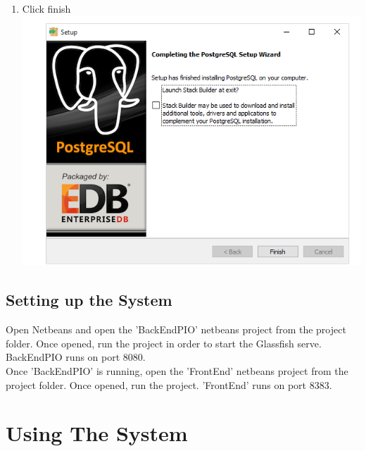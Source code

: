 \documentclass[a4paper,12pt]{article}
\begin{document}
\begin{enumerate}
\item Click finish \\
\includegraphics[width=0.9\linewidth, center]{./Installation/postGresql6.PNG}\\[0.4cm] 

\end{enumerate}

\subsection{Setting up the System}
Open Netbeans and open the 'BackEndPIO' netbeans project from the project folder. Once opened, run the project in order to start the Glassfish serve. BackEndPIO runs on port 8080.\\
Once 'BackEndPIO' is running, open the 'FrontEnd' netbeans project from the project folder. Once opened, run the project. 'FrontEnd' runs on port 8383.

\section{Using The System}
\end{document}

